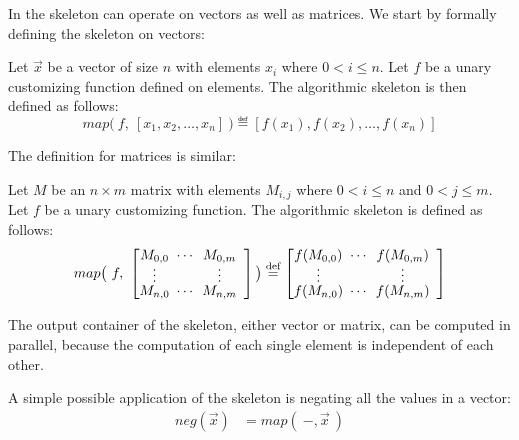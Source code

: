 In \SkelCL the \map skeleton can operate on vectors as well as matrices.
We start by formally defining the skeleton on vectors:
\begin{definition}
  \label{definition:map}
  Let $\vec{x}$ be a vector of size $n$ with elements $x_i$ where $0 < i \leq n$.
  Let $f$ be a unary customizing function defined on elements.
  The algorithmic skeleton \map is then defined as follows:
  \begin{equation*}
    map \big(\ f,\ [x_1, x_2, \dots, x_n]\ \big) \eqdef [f(x_1), f(x_2), \dots, f(x_n)]
  \end{equation*}
\end{definition}
\noindent
The definition for matrices is similar:
\begin{definition}
  \label{definition:map:matrix}
  Let $M$ be an $n\times m$ matrix with elements $M_{i,j}$ where $0 < i \leq n$ and $0 < j \leq m$.
  Let $f$ be a unary customizing function.
  The algorithmic skeleton \map is defined as follows:
  \begin{equation*}
    map\big(\ f,\ \DottedMatrix{M_{0,0}}{M_{0,m}}{M_{n,0}}{M_{n,m}} \big)
      \eqdef \DottedMatrix{f(M_{0,0})}{f(M_{0,m})}{f(M_{n,0})}{f(M_{n,m})}
  \end{equation*}
\end{definition}
\noindent
The output container of the \map skeleton, either vector or matrix, can be computed in parallel, because the computation of each single element is independent of each other.

A simple possible application of the \map skeleton is negating all the values in a vector:
\begin{align*}
  neg(\vec{x}) &= map(\ -, \vec{x}\ )
\end{align*}


